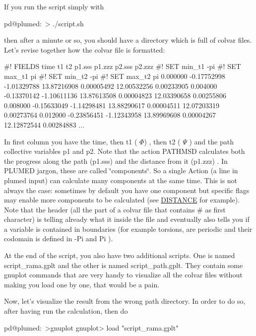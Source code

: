 If you run the script simply with

\begin{DoxyVerb}pd@plumed:~> ./script.sh
\end{DoxyVerb}


then after a minute or so, you should have a directory which is full of colvar files. Let's revise together how the colvar file is formatted\+:

\begin{DoxyVerb}#! FIELDS time t1 t2 p1.sss p1.zzz p2.sss p2.zzz
#! SET min_t1 -pi
#! SET max_t1 pi
#! SET min_t2 -pi
#! SET max_t2 pi
 0.000000  -0.17752998  -1.01329788  13.87216908   0.00005492  12.00532256   0.00233905
 0.004000  -0.13370142  -1.10611136  13.87613508   0.00004823  12.03390658   0.00255806
 0.008000  -0.15633049  -1.14298481  13.88290617   0.00004511  12.07203319   0.00273764
 0.012000  -0.23856451  -1.12343958  13.89969608   0.00004267  12.12872544   0.00284883
...
\end{DoxyVerb}


In first column you have the time, then t1 ( $ \Phi $) , then t2 ( $ \Psi $ ) and the path collective variables p1 and p2. Note that the action P\+A\+T\+H\+M\+S\+D calculates both the progress along the path (p1.\+sss) and the distance from it (p1.\+zzz) . In P\+L\+U\+M\+E\+D jargon, these are called \char`\"{}components\char`\"{}. So a single Action (a line in plumed input) can calculate many components at the same time. This is not always the case\+: sometimes by default you have one component but specific flags may enable more components to be calculated (see \hyperlink{DISTANCE}{D\+I\+S\+T\+A\+N\+C\+E} for example). Note that the header (all the part of a colvar file that contains \# as first character) is telling already what it inside the file and eventually also tells you if a variable is contained in boundaries (for example torsions, are periodic and their codomain is defined in -\/\+Pi and Pi ).

At the end of the script, you also have two additional scripts. One is named script\+\_\+rama.\+gplt and the other is named script\+\_\+path.\+gplt. They contain some gnuplot commands that are very handy to visualize all the colvar files without making you load one by one, that would be a pain.

Now, let's visualize the result from the wrong path directory. In order to do so, after having run the calculation, then do

\begin{DoxyVerb}pd@plumed:~>gnuplot 
gnuplot> load "script_rama.gplt"
\end{DoxyVerb}


